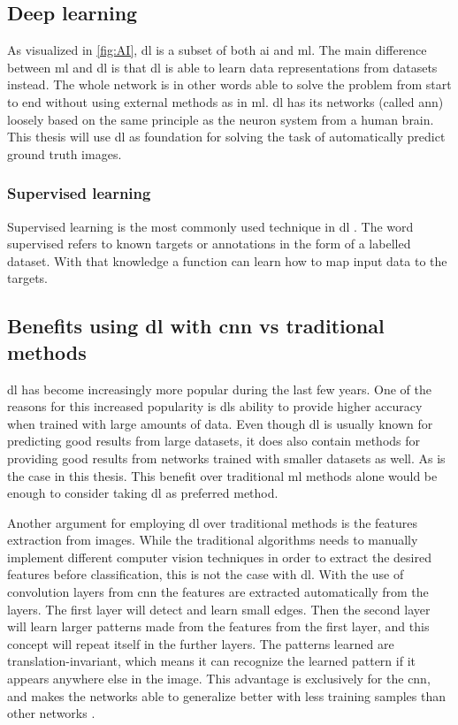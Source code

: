 \documentclass[USenglish]{ifimaster}  %
\begin{document}
\subsection{Deep learning}
As visualized in \cref{fig:AI}, \ac{dl} is a subset of both \ac{ai} and \ac{ml}. The main difference between \ac{ml} and \ac{dl} is that \ac{dl} is able to learn data representations from datasets instead. The whole network is in other words able to solve the problem from start to end without using external methods as in \ac{ml}. \ac{dl} has its networks (called \ac{ann}) loosely based on the same principle as the neuron system from a human brain. This thesis will use \ac{dl} as foundation for solving the task of automatically predict ground truth images. 

\subsubsection{Supervised learning}
Supervised learning is the most commonly used technique in \ac{dl} \cite{Francois_Deep_learning_with_python}. The word supervised refers to known targets or annotations in the form of a labelled dataset. With that knowledge a function can learn how to map input data to the targets.

\subsection{Benefits using \ac{dl} with \ac{cnn} vs traditional methods}
\ac{dl} has become increasingly more popular during the last few years. One of the reasons for this increased popularity is \acp{dl} ability to provide higher accuracy when trained with large amounts of data. Even though \ac{dl} is usually known for predicting good results from large datasets, it does also contain methods for providing good results from networks trained with smaller datasets as well. As is the case in this thesis. This benefit over traditional \ac{ml} methods alone would be enough to consider taking \ac{dl} as preferred method.

Another argument for employing \ac{dl} over traditional methods is the features extraction from images. While the traditional algorithms needs to manually implement different computer vision techniques in order to extract the desired features before classification, this is not the case with \ac{dl}. With the use of convolution layers from \ac{cnn} the features are extracted automatically from the layers.
The first layer will detect and learn small edges. Then the second layer will learn larger patterns made from the features from the first layer, and this concept will repeat itself in the further layers. The patterns learned are translation-invariant, which means it can recognize the learned pattern if it appears anywhere else in the image. This advantage is exclusively for the \ac{cnn}, and makes the networks able to generalize better with less training samples than other networks  \cite{Francois_Deep_learning_with_python}.
\end{document}
